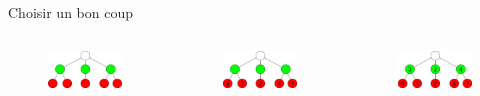 \documentclass{beamer}
\begin{document}
\begin{frame}{Choisir un bon coup}
\begin{columns}
				 {
					\begin{figure}[h]
						\centering
						\includegraphics[width=\textwidth]{images/arbre_recherche.png}
					\end{figure}
				} {
					\alt<2> {
						\begin{figure}[h]
							\centering
							\includegraphics[width=\textwidth]{images/minimax_ex_1.png}
						\end{figure}
					} {
						\alt<3> {
							\begin{figure}[h]
								\centering
								\includegraphics[width=\textwidth]{images/minimax_ex_2.png}

\end{figure}}}}
\end{columns}
\end{frame}
\end{document}
